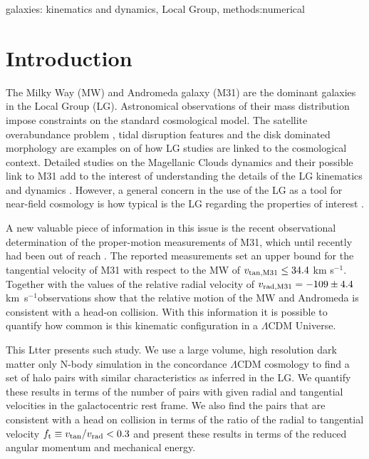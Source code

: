 \documentclass{emulateapj}
\newcommand{\kms}{\,km~s$^{-1}$}
\begin{document}
\begin{keywords}
{galaxies: kinematics and dynamics, Local Group, methods:numerical}
\end{keywords}

\section{Introduction}

The Milky Way (MW) and Andromeda galaxy (M31) are the dominant galaxies in the Local Group (LG). Astronomical observations of their mass distribution impose constraints on the standard cosmological model. The satellite overabundance problem \citep{Klypin99,Moore99}, tidal disruption features \citep{pandas09} and the disk dominated morphology \citep{Kazantzidis2008} are examples on of how LG studies are linked to the cosmological context. Detailed studies on the Magellanic Clouds dynamics and their possible link to M31 add to the interest of understanding the details of the LG kinematics and dynamics \citep{Besla2007,Tollerud2011,Knebe2011,Fouquet2012,Teyssier2012}. However, a general concern in the use of the LG as a tool for near-field cosmology \citep{Freeman2002,Peebles2010} is how typical is the LG regarding the properties of interest \citep{Busha2011,Liu2011,ForeroRomero2011,Purcell2012}. 

A new valuable piece of information in this issue is the recent observational determination of the proper-motion measurements of M31, which until recently had been out of reach \citep{vanderMarel12}.  The reported measurements set an upper bound for the tangential velocity of M31 with respect to the MW of $v_{\rm tan,M31}\leq 34.4$ km s$^{-1}$. Together with the values of the relative radial velocity of $v_{\rm rad,M31}=-109\pm 4.4$ \kms observations show that the relative motion of the MW and Andromeda is consistent with a head-on collision. With this information it is possible to quantify how common is this kinematic configuration in a $\Lambda$CDM Universe.

This Ltter presents such study. We use a large volume, high resolution dark matter only N-body simulation in the concordance $\Lambda$CDM cosmology to find a set of halo pairs with similar  characteristics as inferred in the LG. We quantify these results in terms of the number of pairs with given radial and tangential velocities in the galactocentric rest frame. We also find the pairs that are consistent with a head on collision in terms of the ratio of the radial to tangential velocity $f_{\rm t}\equiv v_{\rm tan}/v_{\rm rad}<0.3$ and present these results in terms of the reduced angular momentum and mechanical energy.
\end{document}
